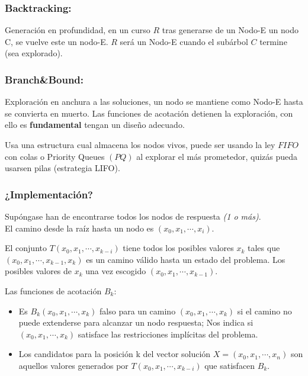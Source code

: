 \subsubsection{Backtracking:}
Generación en profundidad, en un curso $R$ tras generarse de un Nodo-E un nodo C, se vuelve este un nodo-E.
$R$ será un Nodo-E cuando el subárbol $C$ termine (sea explorado).

\subsubsection{Branch\&Bound:}
Exploración en anchura a las soluciones, un nodo se mantiene como Nodo-E hasta se convierta en muerto. Las funciones de acotación detienen la exploración, con ello es \textbf{fundamental} tengan un diseño adecuado.

Usa una estructura cual almacena los nodos vivos, puede ser usando la ley $FIFO$ con colas o Priority Queues $(PQ)$ al explorar el más prometedor, quizás pueda usarsen pilas (estrategia LIFO).

\subsubsection{¿Implementación?}
\begin{definition}[Implementación]

	Supóngase han de encontrarse todos los nodos de respuesta \textit{(1 o más)}.\\

	El camino desde la raíz hasta un nodo es $(x_0,x_1,\cdots,x_i)$.

	El conjunto $T(x_0,x_1,\cdots,x_{k-i})$ tiene todos los posibles valores $x_k$ tales que $(x_0,x_1,\cdots,x_{k-1},x_k)$ es un camino válido hasta un estado del problema. Los posibles valores
	de $x_k$ una vez escogido $(x_0,x_1,\cdots,x_{k-1})$.

	Las funciones de acotación $B_k$:
	\begin{itemize}
		\item Es $B_k(x_0,x_1,\cdots,x_k)$ falso para un camino $(x_0,x_1,\cdots, x_k)$ si el camino no puede extenderse para alcanzar un nodo respuesta; Nos indica si $(x_0,x_1,\cdots,x_k)$ satisface las restricciones implícitas del problema.

		\item Los candidatos para la posición k del vector solución $X=(x_0,x_1,\cdots,x_n)$ son aquellos valores generados por $T(x_0,x_1,\cdots,x_{k-i})$ que satisfacen $B_k$.
	\end{itemize}
\end{definition}
